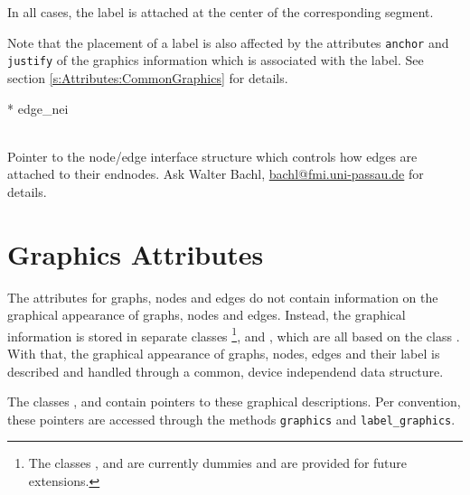 \documentclass[twoside,fleqn]{report}
\begin{document}
\begin{CAttributes}
\begin{notes}
    \item In all cases, the label is attached at the center of
    the corresponding segment.

    \item Note that the placement of a label is also affected by
    the attributes \texttt{anchor} and \texttt{justify} of the
    graphics information which is associated with the label. See
    section \ref{s:Attributes:CommonGraphics} for details.

  \end{notes}
  
  \item[\GT{Edge\_NEI}* edge\_nei] \strut\\
  Pointer to the node/edge interface structure which controls how
  edges are attached to their endnodes. Ask Walter Bachl,
  \url{bachl@fmi.uni-passau.de} for details.

\end{CAttributes}



%
%

\section{Graphics Attributes}
\label{s:Attributes:Graphics}

The \Graphlet{} attributes for graphs, nodes and edges do not
contain information on the graphical appearance of graphs, nodes
and edges.  Instead, the graphical information is stored in
separate classes \footnote{The classes
  ,  and
   are currently dummies and are provided for
  future extensions.},  and
, which are all based on the class
.  With that, the graphical appearance of
graphs, nodes, edges and their label is described and handled
through a common, device independend data structure.

The classes ,  and 
 contain pointers to these graphical 
descriptions.  Per convention, these pointers are accessed through the 
methods \texttt{graphics} and \texttt{label\_graphics}.
\end{document}
